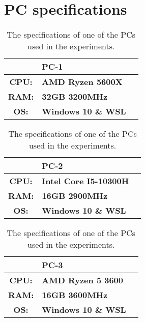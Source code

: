 \chapter{PC specifications}\label{cha:pc-specs}

\begin{table}[htb!]
    \centering
    \begin{tabular}{cp{}p{}}
        \toprule
        \textbf{}     & \textbf{PC-1}              \\
        \midrule
        \textbf{CPU:} & \textbf{AMD Ryzen 5600X}   \\
        \textbf{RAM:} & \textbf{32GB 3200MHz}      \\
        \textbf{OS:}  & \textbf{Windows 10 \& WSL} \\
        \bottomrule
    \end{tabular}
    \caption{The specifications of one of the PCs used in the experiments.}
    \label{tab:pc1-specs}
\end{table}

\begin{table}[htb!]
    \centering
    \begin{tabular}{cp{}p{}}
        \toprule
        \textbf{}     & \textbf{PC-2}                 \\
        \midrule
        \textbf{CPU:} & \textbf{Intel Core I5-10300H} \\
        \textbf{RAM:} & \textbf{16GB 2900MHz}         \\
        \textbf{OS:}  & \textbf{Windows 10 \& WSL}    \\
        \bottomrule
    \end{tabular}
    \caption{The specifications of one of the PCs used in the experiments.}
    \label{tab:pc2-specs}
\end{table}

\begin{table}[htb!]
    \centering
    \begin{tabular}{cp{}p{}}
        \toprule
        \textbf{}     & \textbf{PC-3}              \\
        \midrule
        \textbf{CPU:} & \textbf{AMD Ryzen 5 3600}  \\
        \textbf{RAM:} & \textbf{16GB 3600MHz}      \\
        \textbf{OS:}  & \textbf{Windows 10 \& WSL} \\
        \bottomrule
    \end{tabular}
    \caption{The specifications of one of the PCs used in the experiments.}
    \label{tab:pc3-specs}
\end{table}

